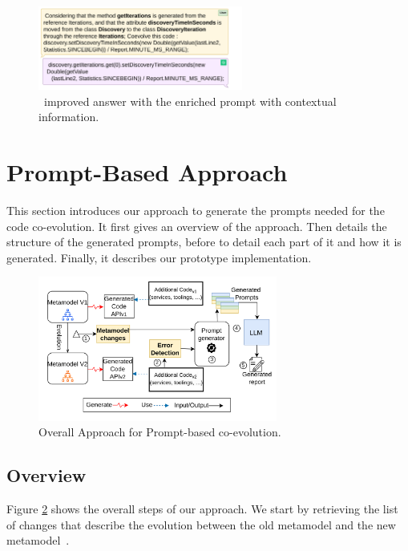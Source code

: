 \begin{figure}[t]
	\centering
	\includegraphics[width=0.6\textwidth]{./pics/chapter3pics/chatgptimprivedanswer.png}
	\caption{\LLM~improved answer with the enriched prompt with contextual information.}
	\label{fig: chatgptimprovedanswer}
	\vspace{-5mm}
\end{figure}
\section{Prompt-Based Approach}
\label{ch3_appraoch}
This section introduces our approach to generate the prompts needed for the code co-evolution. 
It first gives an overview of the approach. Then details the structure of the generated prompts, before to detail each part of it and how it is generated. Finally, it describes our prototype implementation.  

\begin{figure}
	\centering
	\hspace*{-0.8cm}
	\includegraphics[width=0.7\textwidth]{./pics/chapter3pics/approach.png}
	\caption{Overall Approach for Prompt-based co-evolution.}
	\label{fig: approach}
\end{figure}



\subsection{Overview}

Figure \ref{fig: approach} shows the overall steps of our approach. We start by retrieving the list of changes that describe the evolution between the old metamodel and the new metamodel~. 

